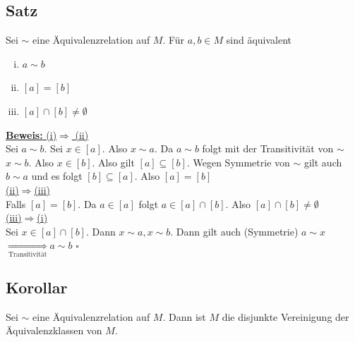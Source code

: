 \subsection{Satz} %
\label{sub:satz}
Sei $\sim$ eine Äquivalenzrelation auf $M$. Für $a,b \in M$ sind äquivalent
\begin{enumerate}[(i)]
	\item $a \sim b$
	\item $[a]=[b]$
	\item $[a] \cap [b] \not= \emptyset$
\end{enumerate}
\underline{\textbf{Beweis:} (i)$\Rightarrow $ (ii)} 
\vspace{4pt} \\
Sei $a \sim b$. Sei $x \in [a]$. Also $x \sim a$. Da $a \sim b$ folgt mit der Transitivität von $\sim$ $x \sim b$. 
Also $x \in [b]$. Also gilt $[a]\subseteq [b]$. Wegen Symmetrie von $\sim$ gilt auch $b\sim a$ und es folgt
$[b]\subseteq [a]$. Also $[a]=[b]$
\vspace{10pt} \\
\underline{(ii)$\Rightarrow $(iii)} 
\vspace{4pt} \\
Falls $[a]=[b]$. Da $a \in [a]$ folgt $a \in [a]\cap [b]$. Also $[a] \cap [b]\not= \emptyset$
\vspace{10pt} \\
\underline{(iii)$\Rightarrow$(i)}
\vspace{4pt} \\
Sei $x \in [a]\cap [b]$. Dann $x \sim a, x \sim b$. Dann gilt auch (Symmetrie) $a\sim x$ \\
$\underset{\text{Transitivität}}{\Longrightarrow} a\sim b$ \hfill \( \square \)

\subsection{Korollar} %
\label{sub:korollar}
Sei $\sim$ eine Äquivalenzrelation auf $M$. Dann ist $M$ die disjunkte Vereinigung der Äquivalenzklassen von $M$.


